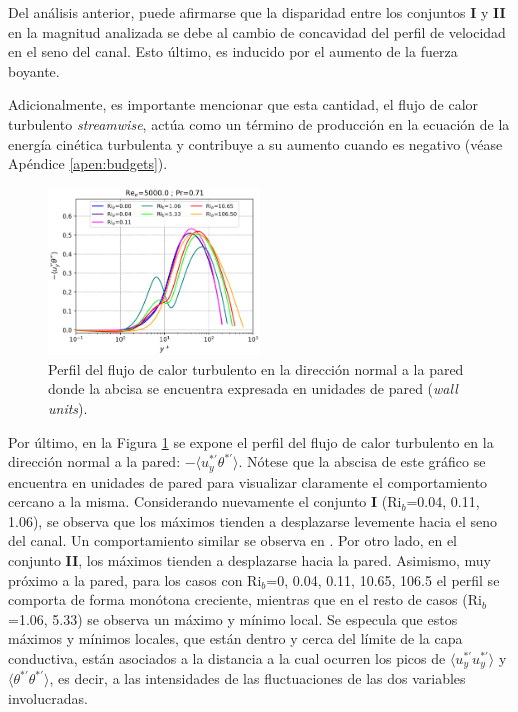 Del análisis anterior, puede afirmarse que la disparidad entre los conjuntos \textbf{I} y \textbf{II} en la magnitud analizada se debe al cambio de concavidad del perfil de velocidad en el seno del canal. Esto último, es inducido por el aumento de la fuerza boyante. 

Adicionalmente, es importante mencionar que esta cantidad, el flujo de calor turbulento \textit{streamwise}, actúa como un término de producción en la ecuación de la energía cinética turbulenta y contribuye a su aumento cuando es negativo (véase Apéndice \ref{apen:budgets}).


\begin{figure}[H] %
  \centering
  \includegraphics[width=0.5\textwidth]{figures/cap5/Re5000-Pr071/uyphif_profile.png}  
  \caption{Perfil del flujo de calor turbulento en la dirección normal a la pared donde la abcisa se encuentra expresada en unidades de pared (\textit{wall units}).}
  \label{fig:uyphi_f-Re5000-Pr071}
\end{figure}

Por último, en la Figura \ref{fig:uyphi_f-Re5000-Pr071} se expone el perfil del flujo de calor turbulento en la dirección normal a la pared: $-\langle u_y^{\ast \prime } \theta^{\ast \prime } \rangle$. Nótese que la abscisa de este gráfico se encuentra en unidades de pared para visualizar claramente el comportamiento cercano a la misma.   Considerando nuevamente el conjunto \textbf{I} (Ri$_b$=0.04, 0.11, 1.06), se observa que los máximos tienden a desplazarse levemente hacia el seno del canal. Un comportamiento similar se observa en \cite{you2003direct}. Por otro lado, en el conjunto \textbf{II}, los máximos tienden a desplazarse hacia la pared. Asimismo, muy próximo a la pared, para los casos con Ri$_b$=0, 0.04, 0.11, 10.65, 106.5 el perfil se comporta de forma monótona creciente, mientras que en el resto de casos (Ri$_b$=1.06, 5.33) se observa un máximo y mínimo local. Se especula que estos máximos y mínimos locales, que están dentro y cerca del límite de la capa conductiva, están asociados a la distancia a la cual ocurren los picos de $\langle u_y^{\ast \prime } u_y^{\ast \prime } \rangle$ y $\langle \theta^{\ast \prime } \theta^{\ast \prime } \rangle$, es decir, a las intensidades de las fluctuaciones de las dos variables involucradas.



